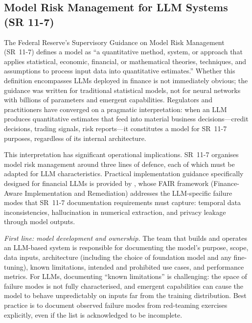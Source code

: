 \begin{context}

\subsection{Model Risk Management for LLM Systems (SR 11-7)}
\label{subsec:af-deployment-mrm}

The Federal Reserve's Supervisory Guidance on Model Risk Management (SR~11-7) \cite{sr117} defines a model as ``a quantitative method, system, or approach that applies statistical, economic, financial, or mathematical theories, techniques, and assumptions to process input data into quantitative estimates.'' Whether this definition encompasses LLMs deployed in finance is not immediately obvious; the guidance was written for traditional statistical models, not for neural networks with billions of parameters and emergent capabilities. Regulators and practitioners have converged on a pragmatic interpretation: when an LLM produces quantitative estimates that feed into material business decisions---credit decisions, trading signals, risk reports---it constitutes a model for SR~11-7 purposes, regardless of its internal architecture.

This interpretation has significant operational implications. SR~11-7 organises model risk management around three lines of defence, each of which must be adapted for LLM characteristics. Practical implementation guidance specifically designed for financial LLMs is provided by \citet{NoguerFAIR2025}, whose FAIR framework (Finance-Aware Implementation and Remediation) addresses the LLM-specific failure modes that SR~11-7 documentation requirements must capture: temporal data inconsistencies, hallucination in numerical extraction, and privacy leakage through model outputs.

\emph{First line: model development and ownership.} The team that builds and operates an LLM-based system is responsible for documenting the model's purpose, scope, data inputs, architecture (including the choice of foundation model and any fine-tuning), known limitations, intended and prohibited use cases, and performance metrics. For LLMs, documenting ``known limitations'' is challenging: the space of failure modes is not fully characterised, and emergent capabilities can cause the model to behave unpredictably on inputs far from the training distribution. Best practice is to document observed failure modes from red-teaming exercises explicitly, even if the list is acknowledged to be incomplete.


\end{context}
